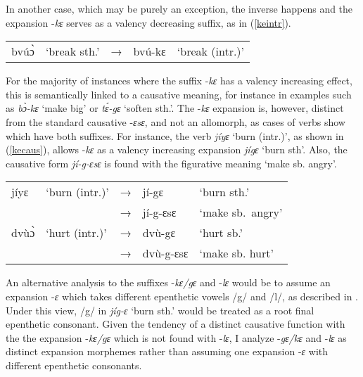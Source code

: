 In another case, which may be purely an exception, the inverse happens and the expansion -{\itshape kɛ} serves as a valency decreasing suffix, as in (\ref{keintr}).

\begin{exe} \ex \label{keintr}
\begin{tabular}{llllp{4cm}}
bvúɔ̀ & `break sth.' & → & bvú-kɛ & `break (intr.)' \\
\end{tabular}
\end{exe}


For the majority of instances where the suffix -{\itshape kɛ} has a valency increasing effect, this is semantically linked to a causative meaning, for instance in examples such as {\itshape bɔ̀-kɛ} `make big' or {\itshape tɛ́-gɛ} `soften sth.'. The -{\itshape kɛ} expansion is, however, distinct from the standard causative -{\itshape ɛsɛ}, and not an allomorph, as cases of verbs show which have both suffixes.
 For instance, the verb {\itshape jíyɛ} `burn (intr.)', as shown in (\ref{kecaus}), allows -{\itshape kɛ} as a valency increasing expansion {\itshape jígɛ} `burn sth'. Also, the causative form {\itshape jí-g-ɛsɛ} is found with the figurative meaning `make sb. angry'. 


\begin{exe} \ex \label{kecaus}
\begin{tabular}{llllp{4cm}}
jíyɛ & `burn (intr.)' & → & jí-gɛ & `burn sth.' \\
 &  & → & jí-g-ɛsɛ & `make sb.\ angry' \\
dvùɔ̀ & `hurt (intr.)' & → & dvù-gɛ & `hurt sb.' \\
 &  & → & dvù-g-ɛsɛ & `make sb. hurt' \\
\end{tabular}
\end{exe}

An alternative analysis to the suffixes -{\itshape kɛ/gɛ} and -{\itshape lɛ} would be to assume an expansion -{\itshape ɛ} which takes different epenthetic vowels /g/ and /l/, as described in . Under this view, /g/ in {\itshape jíg-ɛ} `burn sth.'  would be treated as a root final epenthetic consonant. Given the tendency of a distinct causative function with the the expansion -{\itshape kɛ/gɛ} which is not found with -{\itshape lɛ}, I analyze -{\itshape gɛ/kɛ} and -{\itshape lɛ} as distinct expansion morphemes rather than assuming one expansion -{\itshape ɛ} with different epenthetic consonants.


